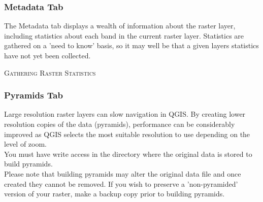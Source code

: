 \subsubsection{Metadata Tab}
The Metadata tab displays a wealth of information about the raster layer,
including statistics about each band in the current raster layer. Statistics are
gathered on a 'need to know' basis, so it may well be that a given layers
statistics have not yet been collected.


\begin{Tip}\caption{\textsc{Gathering Raster Statistics}}
\end{Tip}
\subsubsection{Pyramids Tab}
Large resolution raster layers can slow navigation in QGIS. By creating lower
resolution copies of the data (pyramids), performance can be considerably
improved as QGIS selects the most suitable resolution to use depending on the
level of zoom. \\

You must have write access in the directory where the original data is stored to build pyramids. \\

Please note that building pyramids may alter the original data file and once created they cannot be removed. If you wish to preserve a 'non-pyramided' version of your raster, make a backup copy prior to building pyramids.
